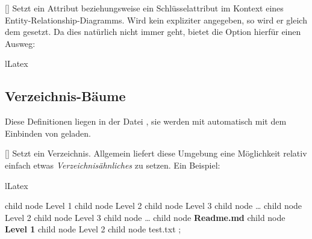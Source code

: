 %
%
%

[\cmdlist\secline{}]
Setzt ein Attribut beziehungsweise ein Schlüsselattribut im Kontext eines Entity-Relationship-Diagramms. Wird kein expliziter  angegeben, so wird er gleich dem  gesetzt. Da dies natürlich nicht immer geht, bietet die Option hierfür einen Ausweg:
\begin{defaultlst}[][listing side text,righthand width=3cm]{lLatex}
\end{defaultlst}


%
%
%

\subsection{Verzeichnis-Bäume}
Diese Definitionen liegen in der Datei , sie werden mit  automatisch mit dem Einbinden von  geladen.

%
%
%

[]
Setzt ein Verzeichnis. Allgemein liefert diese Umgebung eine Möglichkeit relativ einfach etwas \emph{Verzeichnisähnliches} zu setzen. Ein Beispiel:
\begin{defaultlst}[][listing side text,righthand width=4.5cm]{lLatex}
\begin{directory}[scale=0.5]
    child { node {Level 1}
        child { node {Level 2}
            child { node {Level 3} }
            child { node {\ldots} }
        }
        child { node {Level 2}
            child { node {Level 3} }
            child { node {\ldots} }
        }
        child { node {\bfseries Readme.md} }
    }
    child { node {\bfseries Level 1}
        child { node {Level 2} 
                child {node {test.txt} } }
    };
\end{directory}
\end{defaultlst}

%
%
%

